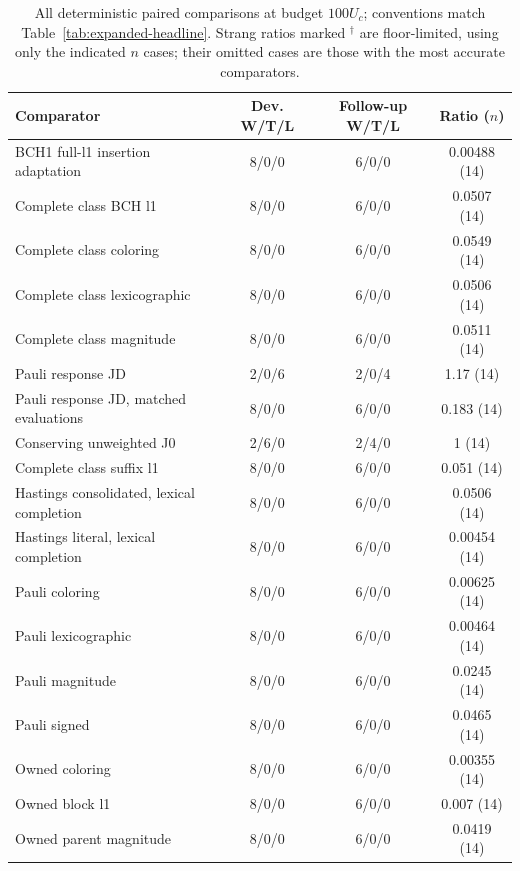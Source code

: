 \begin{table}[htbp]
\centering
\small
\caption{All deterministic paired comparisons at budget $100U_c$; conventions match Table~\ref{tab:expanded-headline}. Strang ratios marked $^{\dagger}$ are floor-limited, using only the indicated $n$ cases; their omitted cases are those with the most accurate comparators.}
\label{tab:expanded-all-0}
\begin{tabular}{p{}ccc}
\toprule
Comparator & Dev. W/T/L & Follow-up W/T/L & Ratio ($n$)\\
\midrule
BCH1 full-l1 insertion adaptation & 8/0/0 & 6/0/0 & 0.00488 (14)\\
Complete class BCH l1 & 8/0/0 & 6/0/0 & 0.0507 (14)\\
Complete class coloring & 8/0/0 & 6/0/0 & 0.0549 (14)\\
Complete class lexicographic & 8/0/0 & 6/0/0 & 0.0506 (14)\\
Complete class magnitude & 8/0/0 & 6/0/0 & 0.0511 (14)\\
Pauli response JD & 2/0/6 & 2/0/4 & 1.17 (14)\\
Pauli response JD, matched evaluations & 8/0/0 & 6/0/0 & 0.183 (14)\\
Conserving unweighted J0 & 2/6/0 & 2/4/0 & 1 (14)\\
Complete class suffix l1 & 8/0/0 & 6/0/0 & 0.051 (14)\\
Hastings consolidated, lexical completion & 8/0/0 & 6/0/0 & 0.0506 (14)\\
Hastings literal, lexical completion & 8/0/0 & 6/0/0 & 0.00454 (14)\\
Pauli coloring & 8/0/0 & 6/0/0 & 0.00625 (14)\\
Pauli lexicographic & 8/0/0 & 6/0/0 & 0.00464 (14)\\
Pauli magnitude & 8/0/0 & 6/0/0 & 0.0245 (14)\\
Pauli signed & 8/0/0 & 6/0/0 & 0.0465 (14)\\
Owned coloring & 8/0/0 & 6/0/0 & 0.00355 (14)\\
Owned block l1 & 8/0/0 & 6/0/0 & 0.007 (14)\\
Owned parent magnitude & 8/0/0 & 6/0/0 & 0.0419 (14)\\
\bottomrule
\end{tabular}
\end{table}

